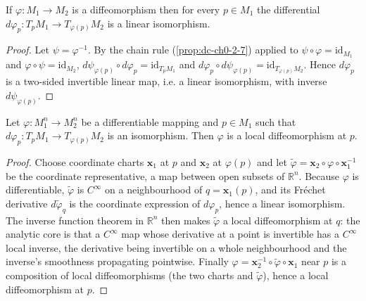 \begin{lemma}
  \label{lem:dc-ch0-2-9-iso}
  \leanok
  If $\varphi:M_1\to M_2$ is a diffeomorphism then for every $p\in M_1$ the
  differential $d\varphi_p:T_pM_1\to T_{\varphi(p)}M_2$ is a linear isomorphism.
\end{lemma}
\begin{proof}
  \sketch
  \leanok
  Let $\psi=\varphi^{-1}$. By the chain rule (\cref{prop:dc-ch0-2-7}) applied to
  $\psi\circ\varphi=\mathrm{id}_{M_1}$ and $\varphi\circ\psi=\mathrm{id}_{M_2}$,
  $d\psi_{\varphi(p)}\circ d\varphi_p=\mathrm{id}_{T_pM_1}$ and
  $d\varphi_p\circ d\psi_{\varphi(p)}=\mathrm{id}_{T_{\varphi(p)}M_2}$. Hence
  $d\varphi_p$ is a two-sided invertible linear map, i.e. a linear isomorphism, with
  inverse $d\psi_{\varphi(p)}$.
\end{proof}

\begin{theorem}
  \label{thm:dc-ch0-2-10}
  \leanok
  Let $\varphi:M_1^n\to M_2^n$ be a differentiable mapping and $p\in M_1$ such that
  $d\varphi_p:T_pM_1\to T_{\varphi(p)}M_2$ is an isomorphism. Then $\varphi$ is a
  local diffeomorphism at $p$.
\end{theorem}
\begin{proof}
  \sketch
  \leanok
  Choose coordinate charts $\mathbf{x}_1$ at $p$ and $\mathbf{x}_2$ at $\varphi(p)$
  and let $\tilde\varphi=\mathbf{x}_2\circ\varphi\circ\mathbf{x}_1^{-1}$ be the
  coordinate representative, a map between open subsets of $\mathbb{R}^n$. Because
  $\varphi$ is differentiable, $\tilde\varphi$ is $C^\infty$ on a neighbourhood of
  $q=\mathbf{x}_1(p)$, and its Fréchet derivative $d\tilde\varphi_q$ is the coordinate
  expression of $d\varphi_p$, hence a linear isomorphism. The inverse function theorem
  in $\mathbb{R}^n$ then makes $\tilde\varphi$ a local diffeomorphism at $q$: the
  analytic core is that a $C^\infty$ map whose derivative at a point is invertible has
  a $C^\infty$ local inverse, the derivative being invertible on a whole neighbourhood
  and the inverse's smoothness propagating pointwise. Finally $\varphi=\mathbf{x}_2^{-1}
  \circ\tilde\varphi\circ\mathbf{x}_1$ near $p$ is a composition of local
  diffeomorphisms (the two charts and $\tilde\varphi$), hence a local diffeomorphism
  at $p$.
\end{proof}

